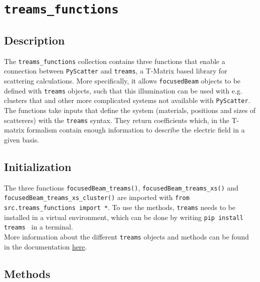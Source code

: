 \section{\texttt{treams\_functions}}

\subsection{Description}
The \texttt{treams\_functions} collection contains three functions that enable a connection between \texttt{PyScatter} and \texttt{treams}, a T-Matrix based library for scattering calculations\cite{treams}. 
More specifically, it allows \texttt{focusedBeam} objects to be defined with \texttt{treams} objects, such that this illumination can be used with e.g. clusters that and other more complicated systems not available with \texttt{PyScatter}.
The functions take inputs that define the system (materials, positions and sizes of scatterers) with the \texttt{treams} syntax. They return coefficients which, in the T-matrix formalism contain enough information to describe the electric field in a given basis.

\subsection{Initialization}
The three functions \texttt{focusedBeam\_treams()}, \texttt{focusedBeam\_treams\_xs()} and \texttt{focusedBeam\_treams\_xs\_cluster()} are imported with \texttt{from src.treams\_functions import *}. \newline
To use the methods, \texttt{treams} needs to be installed in a virtual environment, which can be done by writing \texttt{pip install treams
} in a terminal.\\
More information about the different \texttt{treams} objects and methods can be found in the documentation \href{https://tfp-photonics.github.io/treams/index.html}{here}.


\subsection{Methods}

